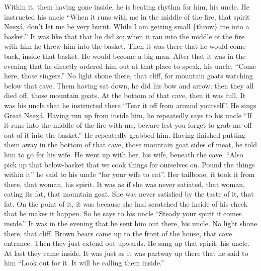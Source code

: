 \begin{pairs}
\begin{Rightside}
Within it, them having gone inside, he is beating rhythm for him, his uncle.
He instructed his uncle
\qqk{}“When it runs with me in the middle of the fire, that spirit Neex̱á, don’t let me be very burnt.
While I am getting small \{throw\} me into a basket.”
It was like that that he did so;
when it ran into the middle of the fire with him he threw him into the basket.
Then it was there that he would come back, inside that basket.
He would become a big man.
\pend
\pstart
{}After that it was in the evening that he directly ordered him out at that place to speak, his uncle.
\qqk{}“Come here, those singers.”
No light shone there, that cliff, for mountain goats watching below that cave.
Them having sat down, he did his bow and arrow;
then they all died off, those mountain goats.
At the bottom of that cave, then it was full.
It was his uncle that he instructed there
\qqk{}“Tear it off from around yourself”.
He sings Great Neex̱á.
Having run up from inside him, he repeatedly says to his uncle
\qqk{}“If it runs into the middle of the fire with me, beware lest you forget to grab me off out of it into the basket.”
He repeatedly grabbed him.
\pend
\pstart
{}Having finished putting them away in the bottom of that cave, those mountain goat sides of meat, he told him to go for his wife.
He went up with her, his wife, beneath the cave.
\qqk{}“Also pick up that below-basket that we cook things for ourselves on.
Pound the things within it” he said to his uncle “for your wife to eat”.
Her tailbone, it took it from there, that woman, his spirit.
It was as if she was never satiated, that woman, eating its fat, that mountain goat.
She was never satisfied by the taste of it, that fat.
On the point of it, it was because she had scratched the inside of his cheek that he makes it happen.
\pend
\pstart
{}So he says to his uncle
\qqk{}“Steady your spirit if  comes inside.”
It was in the evening that he sent him out there, his uncle.
No light shone there, that cliff.
Brown bears came up to the front of the house, that cave entrance.
Then they just extend out upwards.
He sang up that spirit, his uncle.
At last they came inside.
It was just as it was partway up there that he said to him
\qqk{}“Look out for it.
It will be calling them inside.”

\end{Rightside}
\end{pairs}
